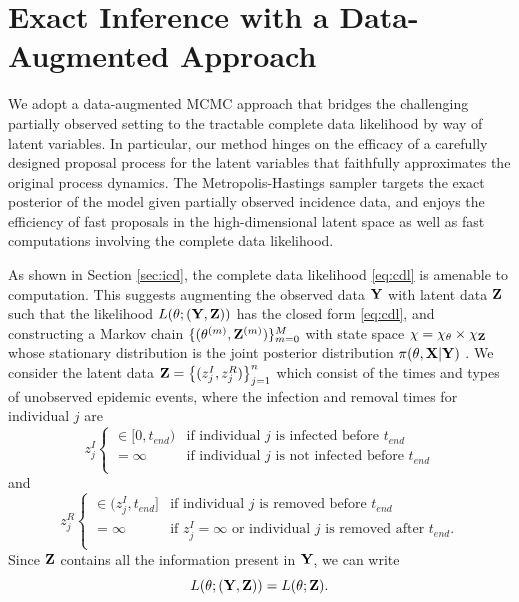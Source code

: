 \documentclass[11pt]{article}
\begin{document}
	\section{Exact Inference with a  Data-Augmented Approach}
	\label{sec:con}
	
	We adopt a data-augmented MCMC approach that bridges the challenging partially observed setting to the tractable complete data likelihood by way of latent variables. In particular, our method hinges on the efficacy of a carefully designed proposal process for the latent variables that faithfully approximates the original process dynamics. 
	The Metropolis-Hastings sampler targets the exact posterior of the model given partially observed incidence data, and enjoys the efficiency of fast proposals in the high-dimensional latent space as well as fast computations involving the complete data likelihood.
	
	As shown in Section \ref{sec:icd}, the complete data likelihood \eqref{eq:cdl} is amenable to computation. This suggests augmenting the observed data $\mathbf{Y}$ with latent data $\mathbf{Z}$ such that the likelihood $L(\theta; (\mathbf{Y}, \mathbf{Z}))$ has the closed form \eqref{eq:cdl}, and constructing a Markov chain $\{(\theta^{(m)}, \mathbf{Z}^{(m)})\}_{m=0}^M$ with state space $\chi = \chi_{\theta} \times \chi_{\mathbf{Z}}$ whose stationary distribution is the joint posterior distribution $\pi(\theta, \mathbf{X}|\mathbf{Y})$ \cite{Gibson.1998, ONeill.1999, Fintzi.2017}. We consider the latent data $\mathbf{Z} = \left\lbrace (z^I_j, z^R_j)\right\rbrace_{j=1}^{n}$ which consist of the times and types of unobserved epidemic events, where the infection and removal times for individual $j$ are
	$$z^I_j \begin{cases}
		\in [0, t_{end}) & \text{if individual } j \text{ is infected before } t_{end} \\
		= \infty & \text{if individual } j \text{ is not infected before } t_{end} \\
	\end{cases}$$
	and
	$$z^R_j \begin{cases}
		\in (z^I_j, t_{end}] & \text{if individual } j \text{ is removed before } t_{end} \\
		= \infty & \text{if } z^I_j = \infty \text{ or individual } j \text{ is removed after } t_{end}. \\
	\end{cases}$$
	Since $\mathbf{Z}$ contains all the information present in $\mathbf{Y}$, we can write
	$$L(\theta; (\mathbf{Y}, \mathbf{Z})) = L(\theta; \mathbf{Z}).$$
	
\end{document}
